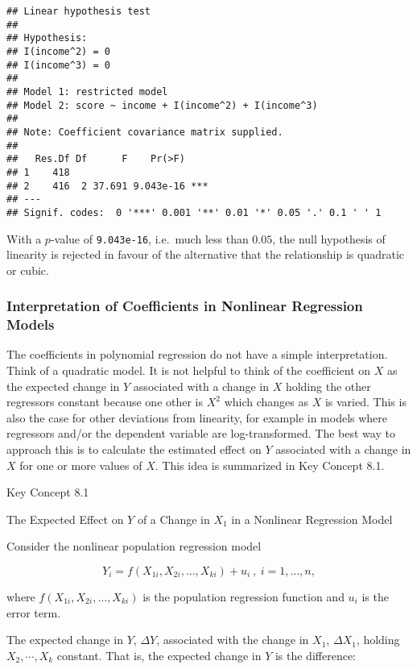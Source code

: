 \documentclass[]{book}
\theoremstyle{definition}
\theoremstyle{definition}
\theoremstyle{definition}
\theoremstyle{remark}
\begin{document}
\begin{verbatim}
## Linear hypothesis test
## 
## Hypothesis:
## I(income^2) = 0
## I(income^3) = 0
## 
## Model 1: restricted model
## Model 2: score ~ income + I(income^2) + I(income^3)
## 
## Note: Coefficient covariance matrix supplied.
## 
##   Res.Df Df      F    Pr(>F)    
## 1    418                        
## 2    416  2 37.691 9.043e-16 ***
## ---
## Signif. codes:  0 '***' 0.001 '**' 0.01 '*' 0.05 '.' 0.1 ' ' 1
\end{verbatim}

With a \(p\)-value of \texttt{9.043e-16}, i.e.~much less than \(0.05\),
the null hypothesis of linearity is rejected in favour of the
alternative that the relationship is quadratic or cubic.

\subsubsection*{Interpretation of Coefficients in Nonlinear Regression
Models}\label{interpretation-of-coefficients-in-nonlinear-regression-models}

The coefficients in polynomial regression do not have a simple
interpretation. Think of a quadratic model. It is not helpful to think
of the coefficient on \(X\) as the expected change in \(Y\) associated
with a change in \(X\) holding the other regressors constant because one
other is \(X^2\) which changes as \(X\) is varied. This is also the case
for other deviations from linearity, for example in models where
regressors and/or the dependent variable are log-transformed. The best
way to approach this is to calculate the estimated effect on \(Y\)
associated with a change in \(X\) for one or more values of \(X\). This
idea is summarized in Key Concept 8.1.

Key Concept 8.1

The Expected Effect on \(Y\) of a Change in \(X_1\) in a Nonlinear
Regression Model

Consider the nonlinear population regression model

\[ Y_i = f(X_{1i}, X_{2i}, \dots, X_{ki}) + u_i \ , \ i=1,\dots,n,\]

where \(f(X_{1i}, X_{2i}, \dots, X_{ki})\) is the population regression
function and \(u_i\) is the error term.

The expected change in \(Y\), \(\Delta Y\), associated with the change
in \(X_1\), \(\Delta X_1\), holding \(X_2, \cdots , X_k\) constant. That
is, the expected change in \(Y\) is the difference:
\end{document}
